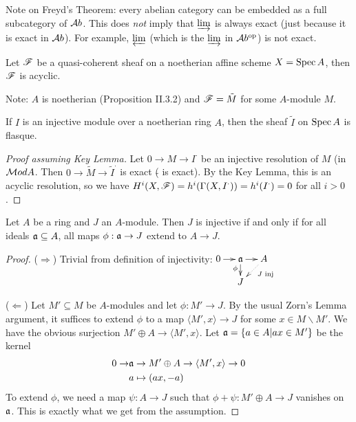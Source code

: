  \setcounter{lecture}{5}

Note on Freyd's Theorem:  every abelian category can be embedded
as a full subcategory of $\mathcal{A}b$.  This does \emph{not} imply that
$\varinjlim$ is always exact (just because it is exact in $\mathcal{A}b$).
For example, $\varprojlim$ (which is the $\varinjlim$ in
$\mathcal{A}b^{\text{op}}$) is not exact.


\begin{theorem}[Goal]\label{T:lec5}
Let $\mathscr{F}$ be a quasi-coherent sheaf on a noetherian affine scheme
$X=\text{\rm Spec\,} A$, then $\mathscr{F}$ is acyclic. 
\end{theorem}

Note: $A$ is noetherian (Proposition II.3.2) and $\mathscr{F}= \tilde{M}$
for some $A$-module $M$.

\begin{lemma}\label{L:lec5keylemma}
If $I$ is an injective module over a noetherian ring $A$, then the
sheaf $\tilde I$ on $\text{\rm Spec\,} A$ is flasque.
\end{lemma}

\begin{proof}[Proof assuming Key Lemma]
Let $0\to M\to I^{\cdot}$ be an injective resolution of $M$ (in
$\mathcal{M}od{A}$.  Then $0\to \tilde M\to \tilde I^{\cdot}$ is exact
($\tilde{}$ is exact).  By the Key Lemma, this is an acyclic
resolution, so we have $H^i(X,\mathscr{F}) = h^i(\Gamma(X,I^{\cdot})) =
h^i(I^{\cdot})=0$ for all $i>0$.
\end{proof}

\begin{lemma}\label{L:lec5IdealsEnoughInjectivity}
Let $A$ be a ring and $J$ an $A$-module.  Then $J$ is injective if
and only if for all ideals $\mathfrak{a}\subseteq A$, all maps $\phi:\mathfrak{a}\to
J$ extend to $A\to J$.
\end{lemma}
\begin{proof}
($\Rightarrow$) Trivial from definition of injectivity:$\xymatrix
@C=4mm @R=4mm{0\ar[r] & \a \ar[d]_(.4){\phi} \ar[r] &
A\ar@{.>}[dl]^(.4){\text{$J$ inj}} \\ & J}$

($\Leftarrow$) Let $M'\subseteq M$ be $A$-modules and let
$\phi:M'\to J$.  By the usual Zorn's Lemma argument, it suffices
to extend $\phi$ to a map $\langle M',x\rangle \to J$ for some
$x\in M\smallsetminus M'$.  We have the obvious surjection
$M'\oplus A \to \langle M',x\rangle$.  Let $\mathfrak{a}=\{a\in A|ax\in
M'\}$ be the kernel
\begin{align*}
    0\to &\mathfrak{a} \to M'\oplus A \to
    \langle M',x\rangle \to 0\\
    &a\mapsto (ax,-a)
\end{align*}
To extend $\phi$, we need a map $\psi:A\to J$ such that $\phi+
\psi: M'\oplus A \to J$ vanishes on $\mathfrak{a}$.  This is exactly what we
get from the assumption.
\end{proof}

